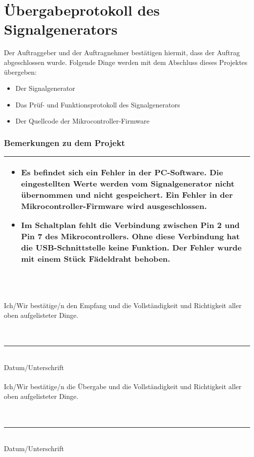 \section[Übergabeprotokoll, Teilauftrag Signalgenerator]{Übergabeprotokoll des Signalgenerators}
\bigskip
Der Auftraggeber und der Auftragnehmer bestätigen hiermit, dass der Auftrag abgeschlossen wurde. Folgende Dinge werden mit dem Abschluss dieses Projektes übergeben:
\begin{itemize}
\item Der Signalgenerator
\item Das Prüf- und Funktionsprotokoll des Signalgenerators
\item Der Quellcode der Mikrocontroller-Firmware
\end{itemize}
\bigskip
\subsubsection*{Bemerkungen zu dem Projekt}

\begin{tabular}{|p{\textwidth}|}
\hline
\begin{itemize}
\item Es befindet sich ein Fehler in der PC-Software. Die eingestellten Werte werden vom Signalgenerator nicht übernommen und nicht gespeichert. Ein Fehler in der Mikrocontroller-Firmware wird ausgeschlossen.
\item Im Schaltplan fehlt die Verbindung zwischen Pin 2 und Pin 7 des Mikrocontrollers. Ohne diese Verbindung hat die USB-Schnittstelle keine Funktion. Der Fehler wurde mit einem Stück Fädeldraht behoben.
\end{itemize}
~\\
\hline
\end{tabular}

\bigskip
\bigskip
Ich/Wir bestätige/n den Empfang und die Vollständigkeit und Richtigkeit aller oben aufgelisteter Dinge.\\
\bigskip \\
\bigskip \\
\rule{5cm}{0.5mm}~\\
Datum/Unterschrift\\
\bigskip \\
Ich/Wir bestätige/n die Übergabe und die Vollständigkeit und Richtigkeit aller oben aufgelisteter Dinge.\\
\bigskip \\
\bigskip \\
\rule{5cm}{0.5mm}~\\
Datum/Unterschrift
